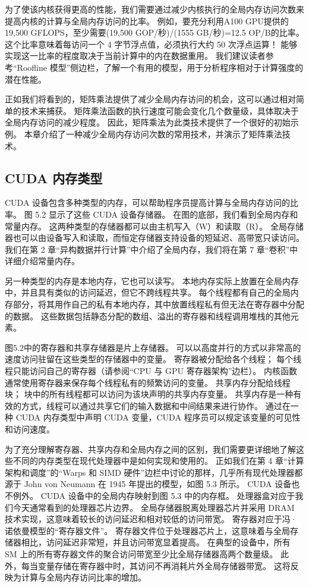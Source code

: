 为了使该内核获得更高的性能，我们需要通过减少内核执行的全局内存访问次数来提高内核的计算与全局内存访问的比率。 例如，要充分利用A100 GPU提供的19,500 GFLOPS，至少需要(19,500 GOP/秒)/(1555 GB/秒)=12.5 OP/B的比率。 这个比率意味着每访问一个 4 字节浮点值，必须执行大约 50 次浮点运算！ 能够实现这一比率的程度取决于当前计算中的内在数据重用。 我们建议读者参考“Roofline 模型”侧边栏，了解一个有用的模型，用于分析程序相对于计算强度的潜在性能。

正如我们将看到的，矩阵乘法提供了减少全局内存访问的机会，这可以通过相对简单的技术来捕获。 矩阵乘法函数的执行速度可能会变化几个数量级，具体取决于全局内存访问的减少程度。 因此，矩阵乘法为此类技术提供了一个很好的初始示例。 本章介绍了一种减少全局内存访问次数的常用技术，并演示了矩阵乘法技术。

\subsection{CUDA 内存类型}
CUDA 设备包含多种类型的内存，可以帮助程序员提高计算与全局内存访问的比率。 图 5.2 显示了这些 CUDA 设备存储器。 在图的底部，我们看到全局内存和常量内存。 这两种类型的存储器都可以由主机写入（W）和读取（R）。 全局存储器也可以由设备写入和读取，而恒定存储器支持设备的短延迟、高带宽只读访问。 我们在第 2 章“异构数据并行计算”中介绍了全局内存，我们将在第 7 章“卷积”中详细介绍常量内存。

另一种类型的内存是本地内存，它也可以读写。 本地内存实际上放置在全局内存中，并且具有类似的访问延迟，但它不跨线程共享。 每个线程都有自己的全局内存部分，将其用作自己的私有本地内存，其中放置线程私有但无法在寄存器中分配的数据。 这些数据包括静态分配的数组、溢出的寄存器和线程调用堆栈的其他元素。

图5.2中的寄存器和共享存储器是片上存储器。 可以以高度并行的方式以非常高的速度访问驻留在这些类型的存储器中的变量。 寄存器被分配给各个线程； 每个线程只能访问自己的寄存器（请参阅“CPU 与 GPU 寄存器架构”边栏）。 内核函数通常使用寄存器来保存每个线程私有的频繁访问的变量。 共享内存分配给线程块； 块中的所有线程都可以访问为该块声明的共享内存变量。 共享内存是一种有效的方式，线程可以通过共享它们的输入数据和中间结果来进行协作。 通过在一种 CUDA 内存类型中声明 CUDA 变量，CUDA 程序员可以规定该变量的可见性和访问速度。

为了充分理解寄存器、共享内存和全局内存之间的区别，我们需要更详细地了解这些不同的内存类型在现代处理器中是如何实现和使用的。 正如我们在第 4 章“计算架构和调度”的“Warps 和 SIMD 硬件”边栏中讨论的那样，几乎所有现代处理器都源于 John von Neumann 在 1945 年提出的模型，如图 5.3 所示。 CUDA 设备也不例外。 CUDA 设备中的全局内存映射到图 5.3 中的内存框。 处理器盒对应于我们今天通常看到的处理器芯片边界。 全局存储器脱离处理器芯片并采用 DRAM 技术实现，这意味着较长的访问延迟和相对较低的访问带宽。 寄存器对应于冯·诺依曼模型的“寄存器文件”。 寄存器文件位于处理器芯片上，这意味着与全局存储器相比，访问延迟非常短，并且访问带宽显着提高。 在典型的设备中，所有 SM 上的所有寄存器文件的聚合访问带宽至少比全局存储器高两个数量级。 此外，每当变量存储在寄存器中时，其访问不再消耗片外全局存储器带宽。 这将反映为计算与全局内存访问比率的增加。

